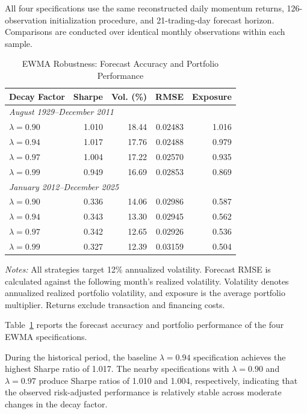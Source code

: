 \documentclass[11pt]{article}
\begin{document}
All four specifications use the same reconstructed
daily momentum returns, 126-observation
initialization procedure, and 21-trading-day
forecast horizon. Comparisons are conducted over
identical monthly observations within each sample.

\begin{table}[htbp]
\centering
\caption{EWMA Robustness: Forecast Accuracy and
Portfolio Performance}
\label{tab:ewma_robustness}
\small
\begin{tabular}{lrrrr}
\toprule
Decay Factor & Sharpe & Vol. (\%) & RMSE
& Exposure \\
\midrule
\multicolumn{5}{l}{\textit{August 1929--December 2011}} \\
$\lambda=0.90$ & 1.010 & 18.44 & 0.02483 & 1.016 \\
$\lambda=0.94$ & 1.017 & 17.76 & 0.02488 & 0.979 \\
$\lambda=0.97$ & 1.004 & 17.22 & 0.02570 & 0.935 \\
$\lambda=0.99$ & 0.949 & 16.69 & 0.02853 & 0.869 \\
\midrule
\multicolumn{5}{l}{\textit{January 2012--December 2025}} \\
$\lambda=0.90$ & 0.336 & 14.06 & 0.02986 & 0.587 \\
$\lambda=0.94$ & 0.343 & 13.30 & 0.02945 & 0.562 \\
$\lambda=0.97$ & 0.342 & 12.65 & 0.02926 & 0.536 \\
$\lambda=0.99$ & 0.327 & 12.39 & 0.03159 & 0.504 \\
\bottomrule
\end{tabular}

\vspace{0.2cm}
\begin{minipage}{0.95\textwidth}
\footnotesize
\textit{Notes:} All strategies target 12\% annualized
volatility. Forecast RMSE is calculated against
the following month's realized volatility.
Volatility denotes annualized realized portfolio
volatility, and exposure is the average portfolio
multiplier. Returns exclude transaction and
financing costs.
\end{minipage}
\end{table}

Table~\ref{tab:ewma_robustness} reports the
forecast accuracy and portfolio performance
of the four EWMA specifications.

During the historical period, the baseline
$\lambda=0.94$ specification achieves the
highest Sharpe ratio of 1.017. The nearby
specifications with $\lambda=0.90$ and
$\lambda=0.97$ produce Sharpe ratios of
1.010 and 1.004, respectively, indicating
that the observed risk-adjusted performance
is relatively stable across moderate
changes in the decay factor.
\end{document}
